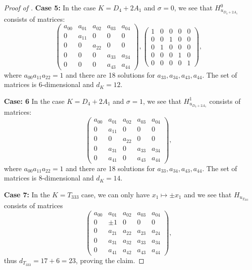 \documentclass[12pt]{amsart}
\numberwithin{equation}{section}
\theoremstyle{plain}
\theoremstyle{remark}
\theoremstyle{definition}
\begin{document}
\begin{proof}[Proof of ]
\medskip


\noindent\textbf{Case 5:} In the case $K=D_4+2A_1$ and $\sigma=0$, we see that $H_{u_{D_4+2A_1}}^0$ consists of matrices:
$$
\begin{pmatrix}
        a_{00} & a_{01} & a_{02} & a_{03} & a_{04}\\
        0 & a_{11} &      0 &      0 &      0\\
        0 &      0 & a_{22} &      0 &      0\\
        0 &      0 &      0 & a_{33} & a_{34}\\
        0 &      0 &      0 & a_{43} & a_{44}
\end{pmatrix},
\begin{pmatrix}
        1 &      0 &      0 &      0 &      0\\
        0 &      0 &      1 &      0 &      0\\
        0 &      1 &      0 &      0 &      0\\
        0 &      0 &      0 &      1 &      0\\
        0 &      0 &      0 &      0 &      1
\end{pmatrix},
$$
where $a_{00}a_{11}a_{22}=1$ and there are 18 solutions for $a_{33},a_{34},a_{43},a_{44}$.
The set of matrices is $6$-dimensional and $d_K=12$.
\medskip

\noindent \textbf{Case: 6} In the case $K=D_4+2A_1$ and $\sigma=1$, we see that $H_{u_{D_4+2A_1}}^1$ consists of matrices:
$$
\begin{pmatrix}
        a_{00} & a_{01} & a_{02} & a_{03} & a_{04}\\
        0 & a_{11} &      0 &      0 &      0\\
       0 &      0 & a_{22} &      0 &      0\\
       0 & a_{31} &      0 & a_{33} & a_{34}\\
      0 & a_{41} &      0 & a_{43} & a_{44}
\end{pmatrix}, $$
where $a_{00}a_{11}a_{22}=1$ and there are 18 solutions for $a_{33},a_{34},a_{43},a_{44}$. The set of matrices is $8$-dimensional and $d_K=14$. 
    
    \noindent \textbf{Case 7:} In the $K= T_{333}$ case, we can only have $x_1\mapsto \pm x_1$ and we see that $H_{u_{T_{333}}}$ consists of matrices
    $$
    \begin{pmatrix}
        a_{00} & a_{01} & a_{02} & a_{03} & a_{04}\\
             0 &  \pm 1 &      0 &      0 &      0\\
             0 & a_{21} & a_{22} & a_{23} & a_{24}\\
             0 & a_{31} & a_{32} & a_{33} & a_{34}\\
             0 & a_{41} & a_{42} & a_{43} & a_{44}
    \end{pmatrix},
    $$
    thus $d_{T_{333}}=17+6=23$, proving the claim.
\end{proof}
\end{document}
